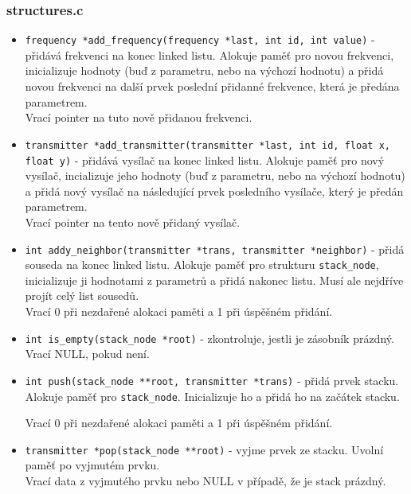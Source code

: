 \documentclass[12pt]{article}
\begin{document}
\subsubsection{structures.c}
\begin{itemize}
	\item \texttt{frequency *add\_frequency(frequency *last, int id,
		int value)} - přidává frekvenci na konec linked listu. Alokuje
		paměť pro novou frekvenci, inicializuje hodnoty (buď z
		parametru, nebo na výchozí hodnotu) a přidá novou
		frekvenci na další prvek poslední přidanné frekvence, která je
		předána parametrem.\\

		Vrací pointer na tuto nově přidanou frekvenci.
	\item \texttt{transmitter *add\_transmitter(transmitter *last, int id,
		float x, float y)} - přidává vysílač na konec linked listu.
		Alokuje paměť pro nový vysílač, incializuje jeho hodnoty (buď 
		z parametru, nebo na výchozí hodnotu) a přidá nový vysílač na
		následující prvek posledního vysílače, který je předán
		parametrem.\\

		Vrací pointer na tento nově přidaný vysílač.
	\item \texttt{int addy\_neighbor(transmitter *trans,
		transmitter *neighbor)} - přidá souseda na konec linked listu.
		Alokuje paměť pro strukturu \texttt{stack\_node}, inicializuje
		ji hodnotami z parametrů a přidá nakonec listu. Musí ale 
		nejdříve projít celý list sousedů.\\

		Vrací 0 při nezdařené alokaci paměti a 1 při úspěšném přidání.
	\item \texttt{int is\_empty(stack\_node *root)} - zkontroluje, jestli
		je zásobník prázdný.\\

		Vrací NULL, pokud není.
	\item \texttt{int push(stack\_node **root, transmitter *trans)} - přidá
		prvek stacku. Alokuje paměť pro \texttt{stack\_node}. 
		Inicializuje ho a přidá ho na začátek stacku.

		Vrací 0 při nezdařené alokaci paměti a 1 při úspěšném přidání.
	\item \texttt{transmitter *pop(stack\_node **root)} - vyjme prvek ze 
		stacku. Uvolní paměť po vyjmutém prvku.\\

		Vrací data z vyjmutého prvku nebo NULL v případě, že je stack
		prázdný.
\end{itemize}
%
\end{document}
